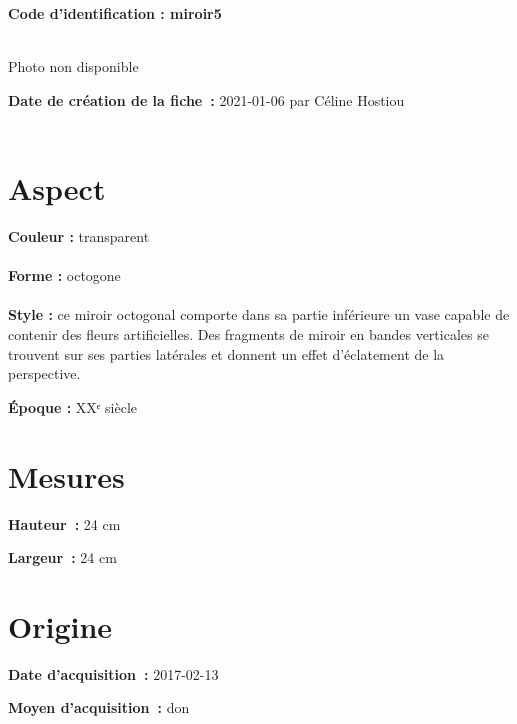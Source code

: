  
    
    
    {\bf \huge Code d’identification : miroir5}
    \\ \\ \hr
    \begin{center}
    Photo non disponible
    \end{center}
    
    {\bf \large Date de création de la fiche :} 2021-01-06
    {par Céline Hostiou}
   \\ \\ \hr
    \section* {Aspect}
   {\bf \large Couleur :} transparent
    \\ \\ {\bf \large Forme :}  octogone
    \\ \\ {\bf \large Style :} 
            ce miroir octogonal comporte dans sa partie inférieure un vase
            capable de contenir des fleurs artificielles. Des fragments de miroir en bandes
            verticales se trouvent sur ses parties latérales et donnent un effet d’éclatement de la
            perspective.
        
        {\bf \large Époque :} XXᵉ siècle
    \section* {Mesures}
      
  {\bf \large Hauteur :} 24 cm
   
   {\bf \large Largeur :} 24 cm
     
    \section* {Origine}
    {\bf \large Date d’acquisition :} 2017-02-13

    {\bf \large Moyen d’acquisition :} don
    
  